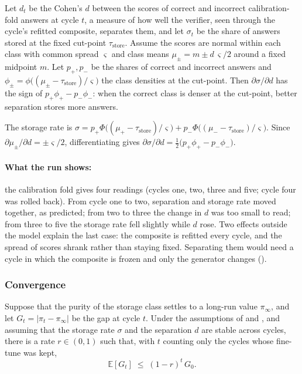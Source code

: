 \begin{heuristic}
\label{thm:monotone}
Let $d_t$ be the Cohen's $d$ between the scores of correct and incorrect calibration-fold answers at cycle $t$, a measure of how well the verifier, seen through the cycle's refitted composite, separates them, and let $\sigma_t$ be the share of answers stored at the fixed cut-point $\tau_{\text{store}}$. Assume the scores are normal within each class with common spread $\varsigma$ and class means $\mu_{\pm} = m \pm d\,\varsigma/2$ around a fixed midpoint $m$. Let $p_{+}, p_{-}$ be the shares of correct and incorrect answers and $\phi_{\pm} = \phi\big((\mu_{\pm} - \tau_{\text{store}})/\varsigma\big)$ the class densities at the cut-point. Then $\partial \sigma / \partial d$ has the sign of $p_{+}\phi_{+} - p_{-}\phi_{-}$: when the correct class is denser at the cut-point, better separation stores more answers.
\end{heuristic}

\begin{sketch}
The storage rate is $\sigma = p_{+} \Phi\big((\mu_{+} - \tau_{\text{store}})/\varsigma\big) + p_{-} \Phi\big((\mu_{-} - \tau_{\text{store}})/\varsigma\big)$. Since $\partial \mu_{\pm}/\partial d = \pm\varsigma/2$, differentiating gives $\partial \sigma / \partial d = \tfrac12\big(p_{+}\phi_{+} - p_{-}\phi_{-}\big)$.
\end{sketch}

\paragraph{What the run shows:} the calibration fold gives four readings (cycles one, two, three and five; cycle four was rolled back). From cycle one to two, separation and storage rate moved together, as predicted; from two to three the change in $d$ was too small to read; from three to five the storage rate fell slightly while $d$ rose. Two effects outside the model explain the last case: the composite is refitted every cycle, and the spread of scores shrank rather than staying fixed. Separating them would need a cycle in which the composite is frozen and only the generator changes ().

\subsubsection{Convergence}
\label{sec:theorem-convergence}

\begin{heuristic}
\label{thm:convergence}
Suppose that the purity of the storage class settles to a long-run value $\pi_{\infty}$, and let $G_t = |\pi_t - \pi_{\infty}|$ be the gap at cycle $t$. Under the assumptions of  and , and assuming that the storage rate $\sigma$ and the separation $d$ are stable across cycles, there is a rate $r \in (0,1)$ such that, with $t$ counting only the cycles whose fine-tune was kept,
\begin{equation}
\mathbb{E}[G_{t}] \;\le\; (1-r)^{t} \, G_{0}.
\label{eq:thm-convergence}
\end{equation}
\end{heuristic}

